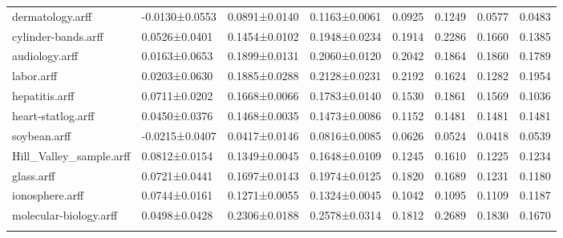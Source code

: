 \begin{table*}[h]
\begin{tabular}{llllllll}
dermatology.arff&-0.0130±0.0553&0.0891±0.0140&0.1163±0.0061&0.0925&0.1249&0.0577&0.0483\\
cylinder-bands.arff&0.0526±0.0401&0.1454±0.0102&0.1948±0.0234&0.1914&0.2286&0.1660&0.1385\\
audiology.arff&0.0163±0.0653&0.1899±0.0131&0.2060±0.0120&0.2042&0.1864&0.1860&0.1789\\
labor.arff&0.0203±0.0630&0.1885±0.0288&0.2128±0.0231&0.2192&0.1624&0.1282&0.1954\\
hepatitis.arff&0.0711±0.0202&0.1668±0.0066&0.1783±0.0140&0.1530&0.1861&0.1569&0.1036\\
heart-statlog.arff&0.0450±0.0376&0.1468±0.0035&0.1473±0.0086&0.1152&0.1481&0.1481&0.1481\\
soybean.arff&-0.0215±0.0407&0.0417±0.0146&0.0816±0.0085&0.0626&0.0524&0.0418&0.0539\\
Hill_Valley_sample.arff&0.0812±0.0154&0.1349±0.0045&0.1648±0.0109&0.1245&0.1610&0.1225&0.1234\\
glass.arff&0.0721±0.0441&0.1697±0.0143&0.1974±0.0125&0.1820&0.1689&0.1231&0.1180\\
ionosphere.arff&0.0744±0.0161&0.1271±0.0055&0.1324±0.0045&0.1042&0.1095&0.1109&0.1187\\
molecular-biology.arff&0.0498±0.0428&0.2306±0.0188&0.2578±0.0314&0.1812&0.2689&0.1830&0.1670\\
\noalign{\smallskip}\hline
\end{tabular}
\end{table*}